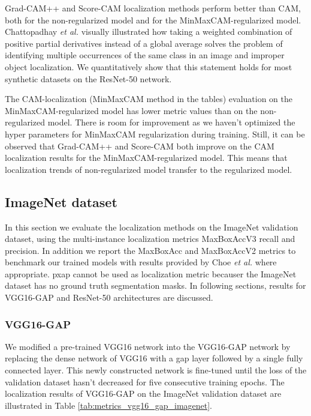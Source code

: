 Grad-CAM++ and Score-CAM localization methods perform better than CAM, both for the non-regularized model and for the MinMaxCAM-regularized model. Chattopadhay \textit{et al.} \cite{chattopadhyay2017grad} visually illustrated how taking a weighted combination of positive partial derivatives instead of a global average solves the problem of identifying multiple occurrences of the same class in an image and improper object localization. We quantitatively show that this statement holds for most synthetic datasets on the ResNet-50 network.

The CAM-localization (MinMaxCAM method in the tables) evaluation on the MinMaxCAM-regularized model has lower metric values than on the non-regularized model. There is room for improvement as we haven't optimized the hyper parameters for MinMaxCAM regularization during training. Still, it can be observed that Grad-CAM++ and Score-CAM both improve on the CAM localization results for the MinMaxCAM-regularized model. This means that localization trends of non-regularized model transfer to the regularized model.

\subsection{ImageNet dataset}
In this section we evaluate the localization methods on the ImageNet validation dataset, using the multi-instance localization metrics MaxBoxAccV3 recall and precision. In addition we report the MaxBoxAcc and MaxBoxAccV2 metrics to benchmark our trained models with results provided by Choe \textit{et al.} \cite{choe2020evaluating} where appropriate. \acrfull{pxap} cannot be used as localization metric becauser the ImageNet dataset has no ground truth segmentation masks. In following sections, results for VGG16-GAP and ResNet-50 architectures are discussed.

\subsubsection{VGG16-GAP}
We modified a pre-trained VGG16 network into the VGG16-GAP network by replacing the dense network of VGG16 with a \acrshort{gap} layer followed by a single fully connected layer. This newly constructed network is fine-tuned until the loss of the validation dataset hasn't decreased for five consecutive training epochs. The localization results of VGG16-GAP on the ImageNet validation dataset are illustrated in Table \ref{tab:metrics_vgg16_gap_imagenet}.

